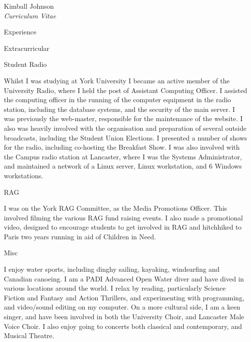\documentclass[10pt]{article}
\begin{document}
\begin{cv}{Kimball Johnson\\{\large \itshape Curriculum Vitae}}
\begin{cvlist}{Experience}
\end{cvlist}

\pagebreak
\begin{cvlist}{Extracurricular}
\item Student Radio

Whilst I was studying at York University I became an active member of the 
University Radio, where I held the post of Assistant Computing Officer. 
I assisted the computing officer in the running of the computer equipment
in the radio station, including the database systems, and the security of the 
main server. I was previously the web-master, responsible for the maintenance of
the website. I also was heavily involved with the organisation and preparation 
of several outside broadcasts, including the Student Union Elections. I 
presented a number of shows for the radio, including co-hosting the Breakfast 
Show.  I was also involved with the Campus radio station at Lancaster, where I 
was the Systems Administrator, and maintained a network of a Linux 
server, Linux workstation, and 6 Windows workstations.
\item RAG

I was on the York RAG Committee, as the Media Promotions Officer. This
involved filming the various RAG fund raising events. I also made a 
promotional video, designed to encourage students to get involved in RAG and 
hitchhiked to Paris two years running in aid of Children in Need.
\item Misc

I enjoy water sports, including dinghy sailing, kayaking, windsurfing and 
Canadian canoeing. I am a PADI Advanced Open Water diver and have dived in 
various locations around the world.
I relax by reading, particularly Science Fiction and Fantasy and 
Action Thrillers, and experimenting with programming, and video/sound editing 
on my computer.
On a more cultural side, I am a keen singer, and have been involved in both
the University Choir, and Lancaster Male Voice Choir.  I also enjoy going to
concerts both classical and contemporary, and Musical Theatre.
\end{cvlist}
\end{cv}
\end{document}
